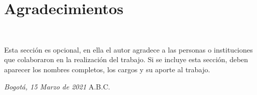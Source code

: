\chapter*{Agradecimientos}
~\newline~\newline~

Esta sección es opcional, en ella el autor agradece a las personas o 
instituciones que colaboraron en la realización del trabajo. Si se 
incluye esta sección, deben aparecer los nombres completos, los cargos 
y su aporte al trabajo.

\lipsum[1-2]

\bigskip

\noindent\textit{Bogotá, 15 Marzo de 2021}
\hfill A.B.C. %
